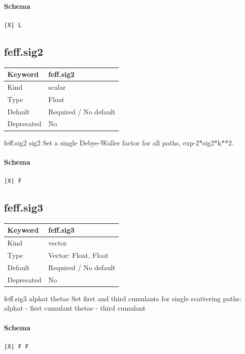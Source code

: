 \documentclass[11pt]{article}
\begin{document}
{{{{\paragraph{Schema}
\begin{Verbatim}
|X| L
\end{Verbatim}

\subsection{feff.sig2}
\label{kw:feff-sig2}
\begin{longtable}{|p{1.5in}|p{4.5in}|}
\hline
Keyword & feff.sig2 \\
\hline
Kind & scalar \\
\hline
Type & Float \\
\hline
Default & Required / No default \\
\hline
Deprecated & No \\
\hline
\end{longtable}
 feff.sig2{ sig2 }
 Set a single Debye-Waller factor for all paths, exp{-2*sig2*k**2}.

\paragraph{Schema}
\begin{Verbatim}
|X| F
\end{Verbatim}

\subsection{feff.sig3}
\label{kw:feff-sig3}
\begin{longtable}{|p{1.5in}|p{4.5in}|}
\hline
Keyword & feff.sig3 \\
\hline
Kind & vector \\
\hline
Type & Vector: Float, Float \\
\hline
Default & Required / No default \\
\hline
Deprecated & No \\
\hline
\end{longtable}
 feff.sig3{ alphat thetae }
 Set first and third cumulants for single scattering paths:
   alphat - first cumulant
   thetae - third cumulant

\paragraph{Schema}
\begin{Verbatim}
|X| F F
\end{Verbatim}

}}}}
\end{document}
